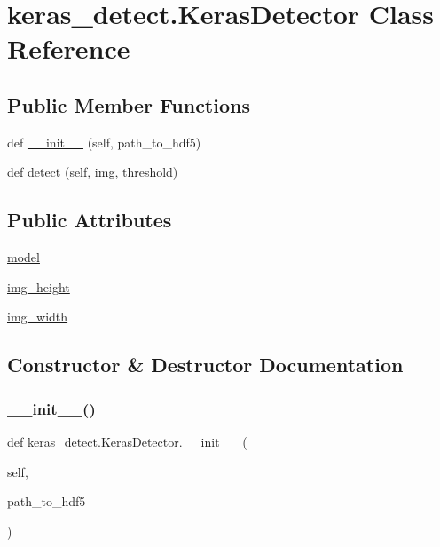 \hypertarget{classkeras__detect_1_1_keras_detector}{}\section{keras\+\_\+detect.\+Keras\+Detector Class Reference}
\label{classkeras__detect_1_1_keras_detector}
\subsection*{Public Member Functions}
\begin{DoxyCompactItemize}
\item 
def \hyperlink{classkeras__detect_1_1_keras_detector_a2ea1f7b1bddbab726db95aef994b65c7}{\+\_\+\+\_\+init\+\_\+\+\_\+} (self, path\+\_\+to\+\_\+hdf5)
\item 
def \hyperlink{classkeras__detect_1_1_keras_detector_a3365b62a0117ff56d5913ff56ae9550b}{detect} (self, img, threshold)
\end{DoxyCompactItemize}
\subsection*{Public Attributes}
\begin{DoxyCompactItemize}
\item 
\hyperlink{classkeras__detect_1_1_keras_detector_a9f1a5aa144f6bc63ad0fbdb2ad4f1bb8}{model}
\item 
\hyperlink{classkeras__detect_1_1_keras_detector_a6c60b5ed2f4149d396ce410e307d7cd2}{img\+\_\+height}
\item 
\hyperlink{classkeras__detect_1_1_keras_detector_ad52720474febcb0bbaed74f51d7bab04}{img\+\_\+width}
\end{DoxyCompactItemize}


\subsection{Constructor \& Destructor Documentation}
\mbox{\label{classkeras__detect_1_1_keras_detector_a2ea1f7b1bddbab726db95aef994b65c7}} 
\subsubsection{\texorpdfstring{\+\_\+\+\_\+init\+\_\+\+\_\+()}{\_\_init\_\_()}}
{\footnotesize\ttfamily def keras\+\_\+detect.\+Keras\+Detector.\+\_\+\+\_\+init\+\_\+\+\_\+ (\begin{DoxyParamCaption}\item[{}]{self,  }\item[{}]{path\+\_\+to\+\_\+hdf5 }\end{DoxyParamCaption})}



